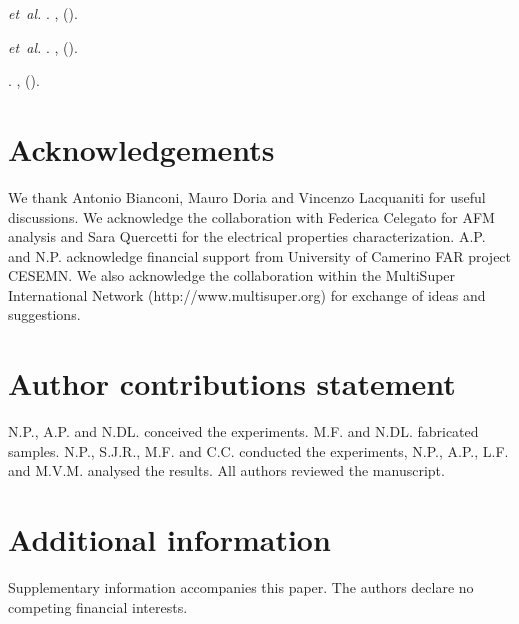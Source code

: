 \documentclass[reprint,onecolumn,superscriptaddress,a4paper,nofootinbib,floatfix]{revtex4-1}
\begin{document}
\begin{thebibliography}{10}
 \emph{et~al.}
\newblock {}.
  \textbf{}, 
  ().

 \emph{et~al.}
\newblock {}.
  \textbf{}, 
  ().

\newblock {}.
  \textbf{}, 
  ().

\end{thebibliography}

\section*{Acknowledgements}
We thank Antonio Bianconi, Mauro Doria and Vincenzo Lacquaniti for useful discussions. We acknowledge the collaboration with Federica Celegato for AFM analysis and Sara Quercetti for the electrical properties characterization.
A.P. and N.P. acknowledge financial support from University of Camerino FAR project CESEMN. We also acknowledge the collaboration within the MultiSuper International Network (http://www.multisuper.org) for exchange of ideas and suggestions.

\section*{Author contributions statement}
N.P., A.P. and N.DL. conceived the experiments. M.F. and N.DL. fabricated samples. N.P., S.J.R., M.F. and C.C. conducted the experiments, N.P., A.P., L.F. and M.V.M. analysed the results. All authors reviewed the manuscript.

\section*{Additional information}
Supplementary information accompanies this paper. The authors declare no competing financial interests.
\end{document}
